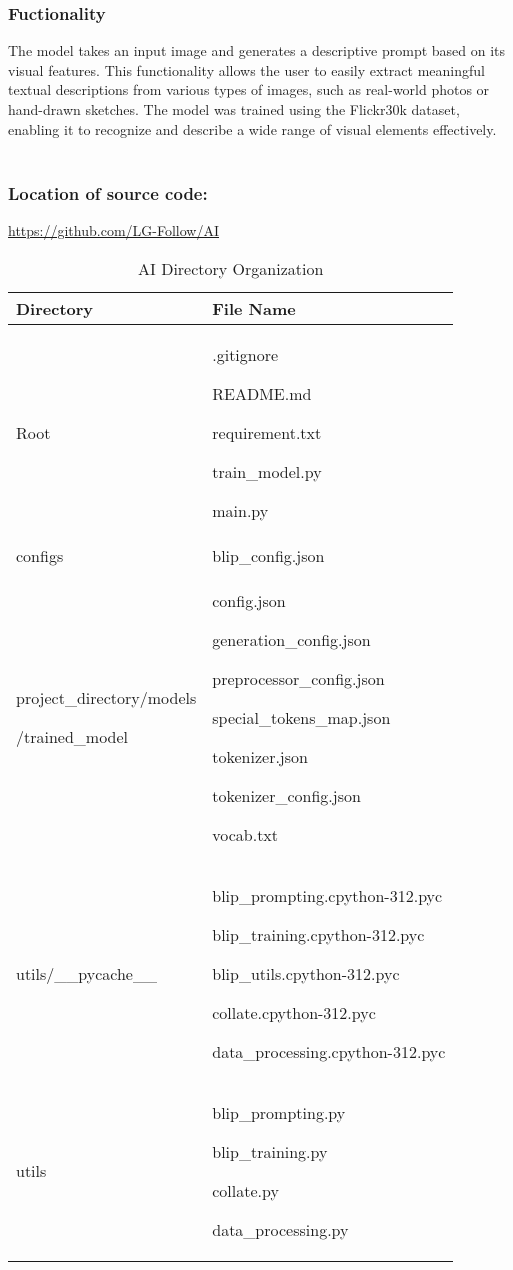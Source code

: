 \documentclass[conference]{IEEEtran}
\begin{document}
\subsubsection{Fuctionality}
\noindent The model takes an input image and generates a descriptive prompt based on its visual features. This functionality allows the user to easily extract meaningful textual descriptions from various types of images, such as real-world photos or hand-drawn sketches. The model was trained using the Flickr30k dataset, enabling it to recognize and describe a wide range of visual elements effectively.\\

\

\subsubsection{Location of source code:}
\url{https://github.com/LG-Follow/AI}\\

\begin{table}[h!]
\caption{AI Directory Organization}
\def\arraystretch{1.4} \small
    \begin{tabular}{|p{4.1cm}|p{4.1cm}|}
        \hline
        Directory & File Name \\ \hline
        Root & .gitignore \par README.md \par requirement.txt
        \par train\_model.py \par main.py\\ \hline
        configs & blip\_config.json \par \\ \hline
        project\_directory/models \par /trained\_model & config.json \par generation\_config.json \par preprocessor\_config.json \par special\_tokens\_map.json \par tokenizer.json \par tokenizer\_config.json \par vocab.txt \\ \hline
        utils/\_\_pycache\_\_ & blip\_prompting.cpython-312.pyc \par blip\_training.cpython-312.pyc \par blip\_utils.cpython-312.pyc \par collate.cpython-312.pyc \par data\_processing.cpython-312.pyc \\ \hline
        utils & blip\_prompting.py \par blip\_training.py \par collate.py \par data\_processing.py \\ \hline
    \end{tabular}
\end{table}
\end{document}
